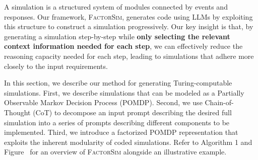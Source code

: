 \documentclass{article}
\theoremstyle{plain}
\theoremstyle{definition}
\theoremstyle{remark}
\newcommand{\method}{\textsc{FactorSim}\xspace}
\begin{document}
A simulation is a structured system of modules connected by events and responses. Our framework, \method, generates code using LLMs by exploiting this structure to construct a simulation progressively. Our key insight is that, by generating a simulation step-by-step while \textbf{only selecting the relevant context information needed for each step}, we can effectively reduce the reasoning capacity needed for each step, leading to simulations that adhere more closely to the input requirements.


In this section, we describe our method for generating Turing-computable simulations.
First, we describe simulations that can be modeled as a Partially Observable Markov Decision Process (POMDP).
Second, we use Chain-of-Thought (CoT) to decompose an input prompt describing the desired full simulation into a series of prompts describing different components to be implemented.
Third, we introduce a factorized POMDP representation that exploits the inherent modularity of coded simulations.
Refer to Algorithm 1 and Figure~\label{fig:method_illustrative_overview} for an overview of \method{} alongside an illustrative example.
\end{document}
